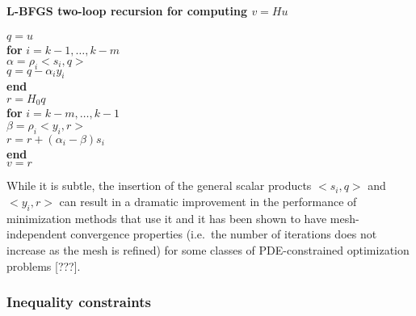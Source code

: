 \bifthen
\textbf{L-BFGS two-loop recursion for computing $v = H u$} \\
\\
$q = u$ \\
\textbf{for} $i = k-1, \ldots , k-m$ \\
\> $\alpha = \rho_i <s_i,q>$ \\
\> $q = q - \alpha_i y_i$ \\
\textbf{end} \\
$r = H_0 q$ \\
\textbf{for} $i = k-m, \ldots , k-1$ \\
\> $\beta = \rho_i <y_i,r>$ \\
\> $r = r + (\alpha_i - \beta) s_i$ \\
\textbf{end} \\
$v = r$
\eifthen

While it is subtle, the insertion of the general scalar products $<s_i,q>$ and
$<y_i,r>$ can result in a dramatic improvement in the performance of
minimization methods that use it and it has been shown to have
mesh-independent convergence properties (i.e.\ the number of iterations does
not increase as the mesh is refined) for some classes of PDE-constrained
optimization problems [???].

\subsubsection{Inequality constraints}

